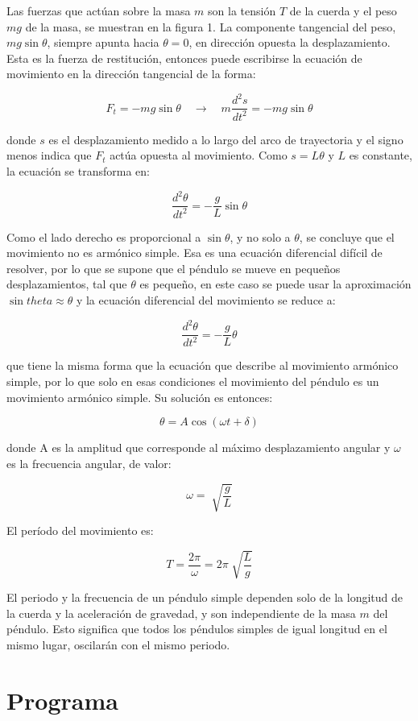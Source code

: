 \documentclass[a4 paper]{article}
\numberwithin{equation}{section}
\newcommand{\0}{\mathbf{0}}
\begin{document}
\newpage
Las fuerzas que act\'uan sobre la masa $m$ son la tensi\'on $T$ de la cuerda y el peso $mg$ de la masa, se muestran en la figura 1. La componente tangencial del peso, $mg \sin{\theta}$, siempre apunta hacia $\theta = 0$, en direcci\'on opuesta la desplazamiento. Esta es la fuerza de restituci\'on, entonces puede escribirse la ecuaci\'on
de movimiento en la direcci\'on tangencial de la forma: 

$$F_{t} = -mg\sin{\theta} \quad \rightarrow \quad m\frac{d^{2}s}{dt^{2}} = -mg\sin{\theta}$$

donde $s$ es el desplazamiento medido a lo largo del arco de trayectoria y el signo menos indica que $F_{t}$ act\'ua opuesta al movimiento. Como $s = L\theta$ y $L$ es
constante, la ecuaci\'on se transforma en: 

$$\frac{d^{2}\theta}{dt^{2}} = -\frac{g}{L}\sin{\theta}$$

Como el lado derecho es proporcional a $\sin{\theta}$, y no solo a $\theta$, se concluye que el movimiento no es arm\'onico simple. Esa es una ecuaci\'on diferencial dif\'icil de resolver, por lo que se supone que el p\'endulo se mueve en pequeños desplazamientos,
tal que $\theta$ es pequeño, en este caso se puede usar la aproximaci\'on
$\sin{theta} \approx \theta$ y la ecuaci\'on diferencial del movimiento se reduce a: 

$$ \frac{d^{2}\theta}{dt^{2}} = -\frac{g}{L}\theta $$

que tiene la misma forma que la ecuaci\'on que describe al movimiento arm\'onico
simple, por lo que solo en esas condiciones el movimiento del p\'endulo es
un movimiento arm\'onico simple. Su soluci\'on es entonces: 

$$ \theta = A\cos{(\omega t + \delta)} $$

donde A es la amplitud que corresponde al m\'aximo desplazamiento angular y
$\omega$ es la frecuencia angular, de valor:

$$ \omega = \sqrt[]{\frac{g}{L}} $$

El per\'iodo del movimiento es:

$$ T = \frac{2\pi}{\omega} = 2\pi \sqrt[]{\frac{L}{g}}$$

El periodo y la frecuencia de un p\'endulo simple dependen solo de la longitud
de la cuerda y la aceleraci\'on de gravedad, y son independiente de la masa $m$
del p\'endulo. Esto significa que todos los p\'endulos simples de igual longitud
en el mismo lugar, oscilar\'an con el mismo periodo. 

\section*{Programa}
\end{document}
